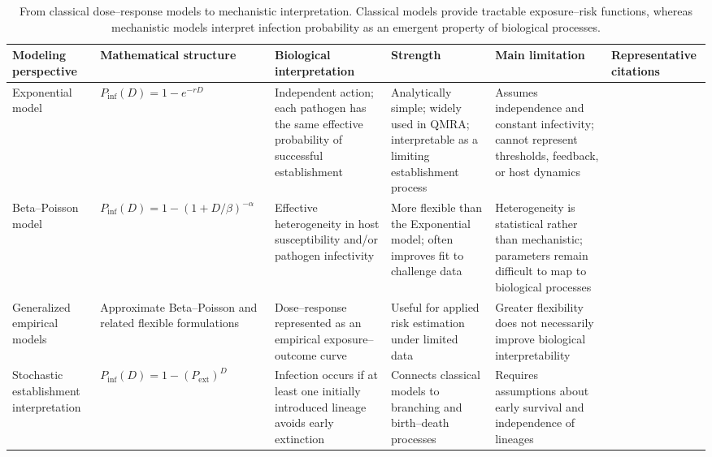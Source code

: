 \documentclass[11pt]{article}
\begin{document}
\begin{landscape}
\begin{table}[p]
\centering
\footnotesize
\setlength{\tabcolsep}{5pt}
\renewcommand{\arraystretch}{1.18}
\caption{From classical dose--response models to mechanistic interpretation. Classical models provide tractable exposure--risk functions, whereas mechanistic models interpret infection probability as an emergent property of biological processes.}
\label{tab:classical_mechanistic_bridge}
\begin{tabularx}{\linewidth}{>{\raggedright\arraybackslash}p{2.6cm} >{\raggedright\arraybackslash}X >{\raggedright\arraybackslash}X >{\raggedright\arraybackslash}X >{\raggedright\arraybackslash}X >{\raggedright\arraybackslash}X}
\toprule
\textbf{Modeling perspective} &
\textbf{Mathematical structure} &
\textbf{Biological interpretation} &
\textbf{Strength} &
\textbf{Main limitation} &
\textbf{Representative citations} \\
\midrule

Exponential model &
$P_{\mathrm{inf}}(D)=1-e^{-rD}$ &
Independent action; each pathogen has the same effective probability of successful establishment &
Analytically simple; widely used in QMRA; interpretable as a limiting establishment process &
Assumes independence and constant infectivity; cannot represent thresholds, feedback, or host dynamics &
\cite{Haas2014QMRA,Schmidt2013QMRA, Teunis2000BetaPoissonNotSingleHit} \\

Beta--Poisson model &
$P_{\mathrm{inf}}(D)=1-\left(1+D/\beta\right)^{-\alpha}$ &
Effective heterogeneity in host susceptibility and/or pathogen infectivity &
More flexible than the Exponential model; often improves fit to challenge data &
Heterogeneity is statistical rather than mechanistic; parameters remain difficult to map to biological processes &
\cite{Haas2002DoseResponse,Messner2001CryptosporidiumRisk,Teunis2000BetaPoissonNotSingleHit,Teunis2002CryptoVariation} \\

Generalized empirical models &
Approximate Beta--Poisson and related flexible formulations &
Dose--response represented as an empirical exposure--outcome curve &
Useful for applied risk estimation under limited data &
Greater flexibility does not necessarily improve biological interpretability &
\cite{Haas2002DoseResponse,Xie2016GeneralizedBetaPoisson} \\

Stochastic establishment interpretation &
$P_{\mathrm{inf}}(D)=1-(P_{\mathrm{ext}})^D$ &
Infection occurs if at least one initially introduced lineage avoids early extinction &
Connects classical models to branching and birth--death processes &
Requires assumptions about early survival and independence of lineages &
\cite{Allen2010Stochastic,Gostic2019Leptospira,Rahman2016Listeria} \\


\end{tabularx}
\end{table}
\end{landscape}
\end{document}
